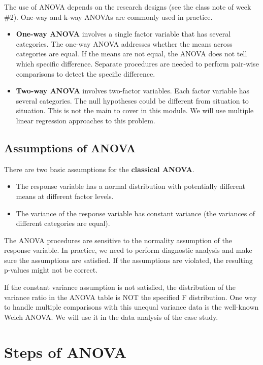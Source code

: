 \documentclass[
]{book}
\begin{document}
The use of ANOVA depends on the research designs (see the class note of week \#2). One-way and k-way ANOVAs are commonly used in practice.

\begin{itemize}
\item
  \textbf{One-way ANOVA} involves a single factor variable that has several categories. The one-way ANOVA addresses whether the means across categories are equal. If the means are not equal, the ANOVA does not tell which specific difference. Separate procedures are needed to perform pair-wise comparisons to detect the specific difference.
\item
  \textbf{Two-way ANOVA} involves two-factor variables. Each factor variable has several categories. The null hypotheses could be different from situation to situation. This is not the main to cover in this module. We will use multiple linear regression approaches to this problem.
\end{itemize}

\hypertarget{assumptions-of-anova}{%
\subsection{Assumptions of ANOVA}\label{assumptions-of-anova}}

There are two basic assumptions for the \textbf{classical ANOVA}.

\begin{itemize}
\item
  The response variable has a normal distribution with potentially different means at different factor levels.
\item
  The variance of the response variable has constant variance (the variances of different categories are equal).
\end{itemize}

The ANOVA procedures are sensitive to the normality assumption of the response variable. In practice, we need to perform diagnostic analysis and make sure the assumptions are satisfied. If the assumptions are violated, the resulting p-values might not be correct.

If the constant variance assumption is not satisfied, the distribution of the variance ratio in the ANOVA table is NOT the specified F distribution. One way to handle multiple comparisons with this unequal variance data is the well-known Welch ANOVA. We will use it in the data analysis of the case study.

\hypertarget{steps-of-anova}{%
\section{Steps of ANOVA}\label{steps-of-anova}}
\end{document}

